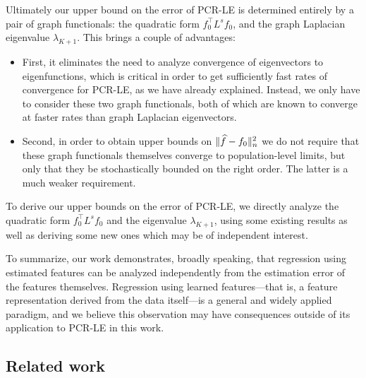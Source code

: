 Ultimately our upper bound on the error of PCR-LE is determined entirely by a pair of graph functionals: the quadratic form $f_0^{\top}L^s f_0$, and the graph Laplacian eigenvalue $\lambda_{K + 1}$. This brings a couple of advantages:
\begin{itemize}
	\item First, it eliminates the need to analyze convergence of eigenvectors to eigenfunctions, which is critical in order to get sufficiently fast rates of convergence for PCR-LE, as we have already explained. Instead, we only have to consider these two graph functionals, both of which are known to converge at faster rates than graph Laplacian eigenvectors. 
	\item Second, in order to obtain upper bounds on $\|\widehat{f} - f_0\|_n^2$ we do not require that these graph functionals themselves converge to population-level limits, but only that they be stochastically bounded on the right order. The latter is a much weaker requirement. 
\end{itemize}
To derive our upper bounds on the error of PCR-LE, we directly analyze the quadratic form $f_0^{\top}L^s f_0$ and the eigenvalue $\lambda_{K + 1}$, using some existing results as well as deriving some new ones which may be of independent interest.

To summarize, our work demonstrates, broadly speaking, that regression using estimated features can be analyzed independently from the estimation error of the features themselves. Regression using learned features---that is, a feature representation derived from the data itself---is a general and widely applied paradigm, and we believe this observation may have consequences outside of its application to PCR-LE in this work.

\subsection{Related work}

